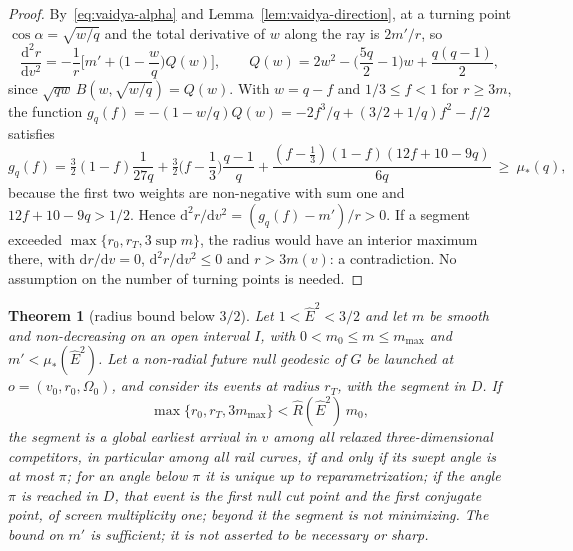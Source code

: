 \documentclass[aip,jmp,amsmath,amssymb,reprint]{revtex4-2}
\newcommand{\Ehat}{\hat E}
\newcommand{\dd}{\mathrm{d}}
\theoremstyle{plain}
\newtheorem{theorem}{Theorem}
\theoremstyle{definition}
\begin{document}
\begin{proof}
By~\eqref{eq:vaidya-alpha} and Lemma~\ref{lem:vaidya-direction}, at a turning point $\cos\alpha=\sqrt{w/q}$ and the
total derivative of $w$ along the ray is $2m'/r$, so
\[
  \frac{\dd^2r}{\dd v^2}=-\frac1r\Big[m'+\Big(1-\frac wq\Big)Q(w)\Big],\qquad
  Q(w)=2w^2-\Big(\frac{5q}2-1\Big)w+\frac{q(q-1)}2 ,
\]
since $\sqrt{qw}\,B(w,\sqrt{w/q})=Q(w)$. With $w=q-f$ and $1/3\le f<1$ for $r\ge3m$, the function
$g_q(f)=-(1-w/q)Q(w)=-2f^3/q+(3/2+1/q)f^2-f/2$ satisfies
\[
  g_q(f)=\tfrac32(1-f)\frac1{27q}+\tfrac32\Big(f-\frac13\Big)\frac{q-1}q
  +\frac{(f-\frac13)(1-f)(12f+10-9q)}{6q}\ \ge\ \mu_*(q),
\]
because the first two weights are non-negative with sum one and $12f+10-9q>1/2$. Hence
$\dd^2r/\dd v^2=(g_q(f)-m')/r>0$. If a segment exceeded $\max\{r_0,r_T,3\sup m\}$, the radius would have an
interior maximum there, with $\dd r/\dd v=0$, $\dd^2r/\dd v^2\le0$ and $r>3m(v)$: a contradiction. No
assumption on the number of turning points is needed.
\end{proof}

\begin{theorem}[radius bound below $3/2$]\label{thm:vaidya-radius}
Let $1<\Ehat^2<3/2$ and let $m$ be smooth and non-decreasing on an open interval $I$, with
$0<m_0\le m\le m_{\max}$ and $m'<\mu_*(\Ehat^2)$. Let a non-radial future null geodesic of $G$ be launched at
$o=(v_0,r_0,\Omega_0)$, and consider its events at radius $r_T$, with the segment in $D$. If
\[
  \max\{r_0,r_T,3m_{\max}\}<\widehat R(\Ehat^2)\,m_0,
\]
the segment is a global earliest arrival in $v$ among all relaxed three-dimensional competitors, in
particular among all rail curves, if and only if its swept angle is at most $\pi$; for an angle below $\pi$
it is unique up to reparametrization; if the angle $\pi$ is reached in $D$, that event is the first null
cut point and the first conjugate point, of screen multiplicity one; beyond it the segment is not
minimizing. The bound on $m'$ is sufficient; it is not asserted to be necessary or sharp.
\end{theorem}
\end{document}
